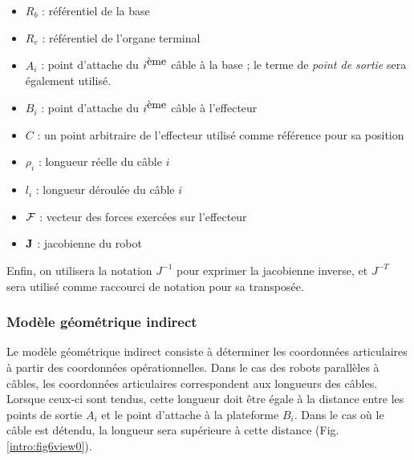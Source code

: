 \begin{itemize}
 \item $R_b$ : référentiel de la base
 \item $R_e$ : référentiel de l'organe terminal
 \item $A_i$ : point d'attache du $i^{\hbox{ème}}$ câble à la base ; le terme de {\it point de sortie} sera également utilisé.
 \item $B_i$ : point d'attache du $i^{\hbox{ème}}$ câble à l'effecteur
 \item $C$ : un point arbitraire de l'effecteur utilisé comme référence pour sa position
 \item $\rho_i$ : longueur réelle du câble $i$
 \item $l_i$ : longueur déroulée du câble $i$
 \item $\bf {\mathcal F}$ : vecteur des forces exercées sur l'effecteur
 \item $\bf J$ : jacobienne du robot
\end{itemize}
Enfin, on utilisera la notation $J^{-1}$ pour exprimer la jacobienne inverse, et $J^{-T}$ sera utilisé comme raccourci de notation pour sa transposée.

\subsubsection{Modèle géométrique indirect}

Le modèle géométrique indirect consiste à déterminer les coordonnées articulaires à partir des coordonnées opérationnelles. Dans le cas des robots parallèles à câbles, les coordonnées articulaires correspondent aux longueurs des câbles. Lorsque ceux-ci sont tendus, cette longueur doit être égale à la distance entre les points de sortie $A_i$ et le point d'attache à la plateforme $B_i$. Dans le cas où le câble est détendu, la longueur sera supérieure à cette distance (Fig.\ref{intro:fig6view0}).\\

